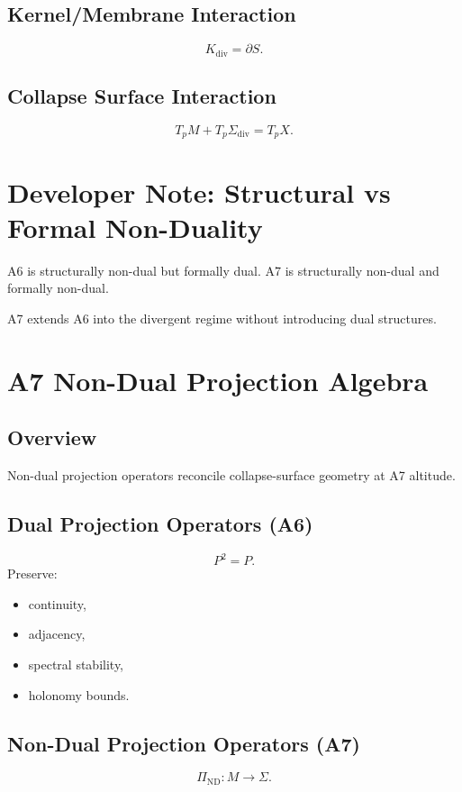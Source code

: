 \documentclass[11pt]{article}
\begin{document}
\subsection{Kernel/Membrane Interaction}
\[
K_{\mathrm{div}} = \partial S.
\]

\subsection{Collapse Surface Interaction}
\[
T_p M + T_p \Sigma_{\mathrm{div}} = T_p X.
\]

\section{Developer Note: Structural vs Formal Non-Duality}

A6 is structurally non-dual but formally dual.  
A7 is structurally non-dual and formally non-dual.

A7 extends A6 into the divergent regime without introducing dual structures.

\section{A7 Non-Dual Projection Algebra}

\subsection{Overview}
Non-dual projection operators reconcile collapse-surface geometry at A7 altitude.

\subsection{Dual Projection Operators (A6)}
\[
P^2 = P.
\]
Preserve:
\begin{itemize}
  \item continuity,
  \item adjacency,
  \item spectral stability,
  \item holonomy bounds.
\end{itemize}

\subsection{Non-Dual Projection Operators (A7)}
\[
\Pi_{\mathrm{ND}} : M \to \Sigma.
\]
\end{document}
